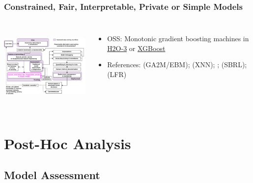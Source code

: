 \documentclass[11pt,
               aspectratio=169,
               hyperref={colorlinks}
               ]{beamer}
\begin{document}
			\begin{frame}
		
				\frametitle{Constrained, Fair, Interpretable, Private or Simple Models}		
			
				\begin{columns}
	
					\centering
					\includegraphics[height=120pt]{img/im.png}
				
					\vspace{-5pt}
					\small
					\begin{itemize}
						\item OSS: Monotonic gradient boosting machines in \href{https://github.com/h2oai/h2o-3/blob/master/h2o-py/demos/H2O_tutorial_gbm_monotonicity.ipynb}{H2O-3} or \href{https://xiaoxiaowang87.github.io/monotonicity_constraint/}{XGBoost}
						\item References:  (GA2M/EBM);  (XNN); ;  (SBRL);  (LFR)	
					\end{itemize}
					\normalsize
				
				\end{columns}			
			
			\end{frame}

	\section{Post-Hoc Analysis}

		\subsection{Model Assessment}
\end{document}
